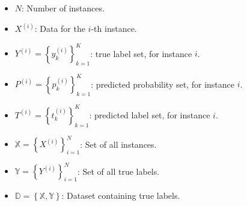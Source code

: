 \begin{itemize}
    \item  $N $: Number of instances.

    \item $X^{(i)} $: Data for the $i $-th instance.

    \item $Y^{(i)} = {\left\{ y_k^{(i)}\right\}}_{k=1}^{K} $: true label set, for instance $i $.

    \item  $P^{(i)} = {\left\{p_k^{(i)}\right\}}_{k=1}^{K} $: predicted probability set, for instance $i $.

    \item  $T^{(i)} = {\left\{t_k^{(i)}\right\}}_{k=1}^{K} $: predicted label set, for instance $i $.

    \item  $\mathbb{X} = {\left\{X^{(i)}\right\}}_{i=1}^{N} $: Set of all instances.

    \item  $\mathbb{Y} = {\left\{Y^{(i)}\right\}}_{i=1}^{N} $: Set of all true labels.

    \item  $\mathbb{D} = \left\{\mathbb{X},\mathbb{Y} \right\} $: Dataset containing true labels.





\end{itemize}
